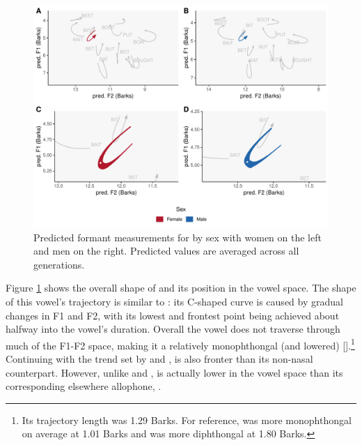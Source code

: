 \begin{figure}[tb!]
    \centering
    \includegraphics[width = 6.5in]{Figures/BIN/BIN_four_panel_plot_summarized.pdf}
    \caption[Predicted formant measurements for \bin by sex.]{Predicted formant measurements for \bin by sex with women on the left and men on the right. Predicted values are averaged across all generations.}
    \label{fig:BIN_four_panel_plot_summarized}
\end{figure}

Figure \ref{fig:BIN_four_panel_plot_summarized} shows the overall shape of \bin and its position in the vowel space. The shape of this vowel's trajectory is similar to \ban: its C-shaped curve is caused by gradual changes in F1 and F2, with its lowest and frontest point being achieved about halfway into the vowel's duration. Overall the vowel does not traverse through much of the F1-F2 space, making it a relatively monophthongal (and lowered) [].\footnote{Its trajectory length was 1.29 Barks. For reference, \ben was more monophthongal on average at 1.01 Barks and \ban was more diphthongal at 1.80 Barks.} Continuing with the trend set by \ban and \ben, \bin is also fronter than its non-nasal counterpart. However, unlike \ban and \ben, \bin is actually lower in the vowel space than its corresponding elsewhere allophone, \bit.

